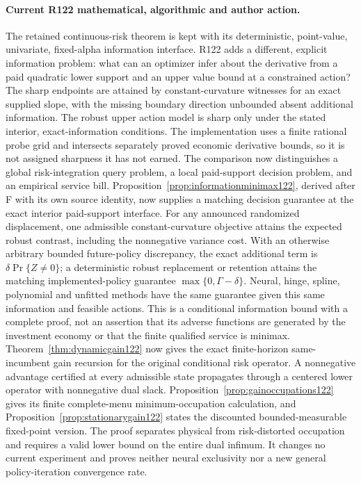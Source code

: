 \paragraph{Current R122 mathematical, algorithmic and author action.}
The retained continuous-risk theorem is kept with its deterministic, point-value, univariate, fixed-alpha information interface. R122 adds a different, explicit information problem: what can an optimizer infer about the derivative from a paid quadratic lower support and an upper value bound at a constrained action? The sharp endpoints are attained by constant-curvature witnesses for an exact supplied slope, with the missing boundary direction unbounded absent additional information. The robust upper action model is sharp only under the stated interior, exact-information conditions. The implementation uses a finite rational probe grid and intersects separately proved economic derivative bounds, so it is not assigned sharpness it has not earned. The comparison now distinguishes a global risk-integration query problem, a local paid-support decision problem, and an empirical service bill. Proposition~\ref{prop:informationminimax122}, derived after F with its own source identity, now supplies a matching decision guarantee at the exact interior paid-support interface. For any announced randomized displacement, one admissible constant-curvature objective attains the expected robust contrast, including the nonnegative variance cost. With an otherwise arbitrary bounded future-policy discrepancy, the exact additional term is $\delta\Pr\{Z\ne0\}$; a deterministic robust replacement or retention attains the matching implemented-policy guarantee $\max\{0,\Gamma-\delta\}$. Neural, hinge, spline, polynomial and unfitted methods have the same guarantee given this same information and feasible actions. This is a conditional information bound with a complete proof, not an assertion that its adverse functions are generated by the investment economy or that the finite qualified service is minimax. Theorem~\ref{thm:dynamicgain122} now gives the exact finite-horizon same-incumbent gain recursion for the original conditional risk operator. A nonnegative advantage certified at every admissible state propagates through a centered lower operator with nonnegative dual slack. Proposition~\ref{prop:gainoccupations122} gives its finite complete-menu minimum-occupation calculation, and Proposition~\ref{prop:stationarygain122} states the discounted bounded-measurable fixed-point version. The proof separates physical from risk-distorted occupation and requires a valid lower bound on the entire dual infimum. It changes no current experiment and proves neither neural exclusivity nor a new general policy-iteration convergence rate.
